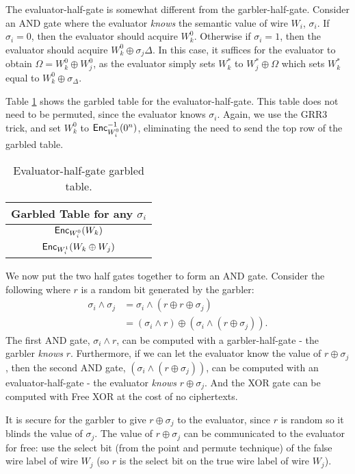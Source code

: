 The evaluator-half-gate is somewhat different from the garbler-half-gate.
Consider an AND gate where the evaluator \textit{knows} the semantic value of wire $W_i$, $\sigma_i$.
If $\sigma_i = 0$, then the evaluator should acquire $W_k^0$. 
Otherwise if $\sigma_i = 1$, then the evaluator should acquire $W_k^0 \oplus \sigma_j\Delta$.
In this case, it suffices for the evaluator to obtain $\Omega = W_k^0 \oplus W_j^0$, as the evaluator simply sets $W_k^*$ to $W_j^* \oplus \Omega$ which sets $W_k^*$ equal to $W_k^0 \oplus \sigma_\Delta$.

Table \ref{tbl:halfgate-gg-eval} shows the garbled table for the evaluator-half-gate.
This table does not need to be permuted, since the evaluator knows $\sigma_i$.
Again, we use the GRR3 trick, and set $W_k^0$ to $\textsf{Enc}^{-1}_{W_i^0}(0^n)$, eliminating the need to send the top row of the garbled table.

\begin{table}[h]
    \centering
    \begin{tabular}{|c|}
        \hline
        Garbled Table for any $\sigma_i$ \\
        \hline
        $\textsf{Enc}_{W_i^0}(W_k)$ \\
        $\textsf{Enc}_{W_i^1}(W_k \oplus W_j)$ \\
        \hline
    \end{tabular}
    \caption[Evaluator-half-gate garbled table]{Evaluator-half-gate garbled table.}
    \label{tbl:halfgate-gg-eval}
\end{table}

We now put the two half gates together to form an AND gate. 
Consider the following where $r$ is a random bit generated by the garbler:
\begin{align}
    \sigma_i \wedge \sigma_j & = \sigma_i \wedge (r \oplus r \oplus \sigma_j) \\
               & = (\sigma_i \wedge r) \oplus (\sigma_i \wedge (r \oplus \sigma_j)).
\end{align}
The first AND gate, $\sigma_i \wedge r$, can be computed with a garbler-half-gate - the garbler \textit{knows} $r$. 
Furthermore, if we can let the evaluator know the value of $r \oplus \sigma_j$, then the second AND gate, $(\sigma_i \wedge (r \oplus \sigma_j))$, can be computed with an evaluator-half-gate - the evaluator \textit{knows} $r \oplus \sigma_j$. 
And the XOR gate can be computed with Free XOR at the cost of no ciphertexts. 

It is secure for the garbler to give $r \oplus \sigma_j$ to the evaluator, since $r$ is random so it blinds the value of $\sigma_j$. 
The value of $r \oplus \sigma_j$ can be communicated to the evaluator for free: use the select bit (from the point and permute technique) of the false wire label of wire $W_j$ (so $r$ is the select bit on the true wire label of wire $W_j$).


